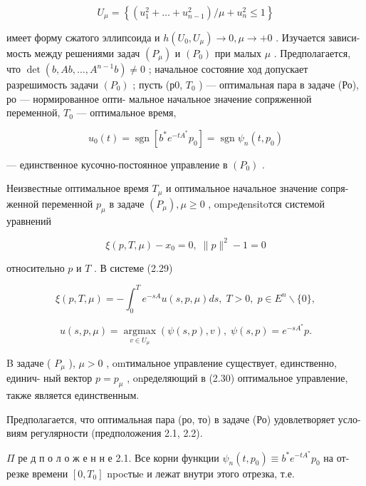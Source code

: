 \documentclass[10pt]{article}
\begin{document}
\[
{U}_{\mu } = \left\{  {\left( {{u}_{1}^{2} + \ldots  + {u}_{n - 1}^{2}}\right) /\mu  + {u}_{n}^{2} \leq  1}\right\}
\]

имеет форму сжатого эллипсоида и \(h\left( {{U}_{0},{U}_{\mu }}\right)  \rightarrow  0,\mu  \rightarrow   + 0\) . Изучается зависи- мость между решениями задач \(\left( {P}_{\mu }\right)\) и \(\left( {P}_{0}\right)\) при малых \(\mu\) . Предполагается, что \(\det \left( {b,{Ab},\ldots ,{A}^{n - 1}b}\right)  \neq  0\) ; начальное состояние ход допускает разрешимость задачи \(\left( {P}_{0}\right)\) ; пусть (р0, \({T}_{0}\) ) — оптимальная пара в задаче (Ро), ро — нормированное опти- мальное начальное значение сопряженной переменной, \({T}_{0}\) — оптимальное время,

\[
{u}_{0}\left( t\right)  = \operatorname{sgn}\left[  {{b}^{ * }{e}^{-t{A}^{ * }}{p}_{0}}\right]   = \operatorname{sgn}{\psi }_{n}\left( {t,{p}_{0}}\right)
\]

— единственное кусочно-постоянное управление в \(\left( {P}_{0}\right)\) .

Неизвестные оптимальное время \({T}_{\mu }\) и оптимальное начальное значение сопря- женной переменной \({p}_{\mu }\) в задаче \(\left( {P}_{\mu }\right) ,\mu  \geq  0\) , ompeдensitoтся системой уравнений

\[
\xi \left( {p,T,\mu }\right)  - {x}_{0} = 0,\;\parallel p{\parallel }^{2} - 1 = 0 \tag{2.29}
\]

относительно \(p\) и \(T\) . В системе (2.29)

\[
\xi \left( {p,T,\mu }\right)  =  - {\int }_{0}^{T}{e}^{-{sA}}u\left( {s,p,\mu }\right) {ds},\;T > 0,\;p \in  {E}^{n} \smallsetminus  \{ 0\} ,
\]

\[
u\left( {s,p,\mu }\right)  = \mathop{\operatorname{argmax}}\limits_{{v \in  {U}_{\mu }}}\left( {\psi \left( {s,p}\right) ,v}\right) ,\;\psi \left( {s,p}\right)  = {e}^{-s{A}^{ * }}p. \tag{2.30}
\]

B задаче ( \({P}_{\mu }\) ), \(\mu  > 0\) , omтимальное управление существует, единственно, единич- ный вектор \(p = {p}_{\mu }\) , onределяющий в (2.30) оптимальное управление, также является единственным.

Предполагается, что оптимальная пара (ро, то) в задаче (Ро) удовлетворяет усло- виям регулярности (предположения 2.1, 2.2).

\(\Pi\) ре д п о л о ж е н н е 2.1. Все корни функции \({\psi }_{n}\left( {t,{p}_{0}}\right)  \equiv  {b}^{ * }{e}^{-t{A}^{ * }}{p}_{0}\) на от- резке времени \(\left[  {0,{T}_{0}}\right]\) npocтыe и лежат внутри этого отрезка, т.е.
\end{document}
